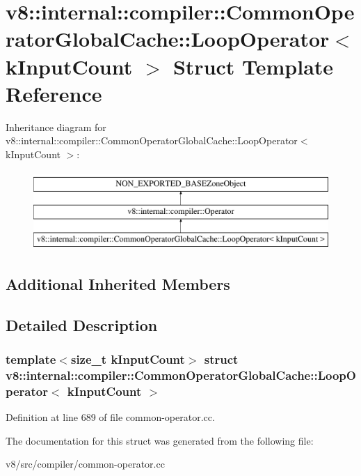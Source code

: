 \hypertarget{structv8_1_1internal_1_1compiler_1_1CommonOperatorGlobalCache_1_1LoopOperator}{}\section{v8\+:\+:internal\+:\+:compiler\+:\+:Common\+Operator\+Global\+Cache\+:\+:Loop\+Operator$<$ k\+Input\+Count $>$ Struct Template Reference}
\label{structv8_1_1internal_1_1compiler_1_1CommonOperatorGlobalCache_1_1LoopOperator}
Inheritance diagram for v8\+:\+:internal\+:\+:compiler\+:\+:Common\+Operator\+Global\+Cache\+:\+:Loop\+Operator$<$ k\+Input\+Count $>$\+:\begin{figure}[H]
\begin{center}
\leavevmode
\includegraphics[height=3.000000cm]{structv8_1_1internal_1_1compiler_1_1CommonOperatorGlobalCache_1_1LoopOperator}
\end{center}
\end{figure}
\subsection*{Additional Inherited Members}


\subsection{Detailed Description}
\subsubsection*{template$<$size\+\_\+t k\+Input\+Count$>$\newline
struct v8\+::internal\+::compiler\+::\+Common\+Operator\+Global\+Cache\+::\+Loop\+Operator$<$ k\+Input\+Count $>$}



Definition at line 689 of file common-\/operator.\+cc.



The documentation for this struct was generated from the following file\+:\begin{DoxyCompactItemize}
\item 
v8/src/compiler/common-\/operator.\+cc\end{DoxyCompactItemize}
